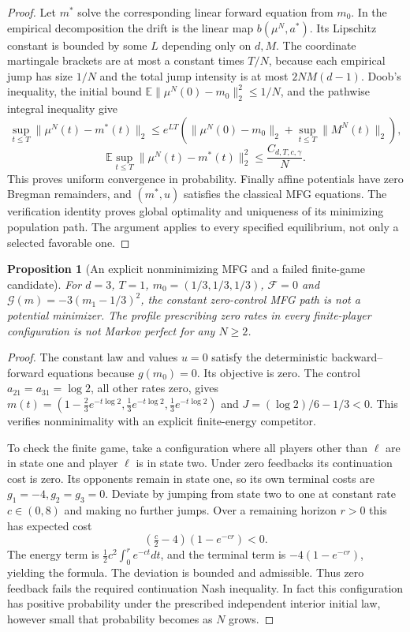 \documentclass[11pt,a4paper]{article}
\newtheorem{proposition}[theorem]{Proposition}
\theoremstyle{definition}
\theoremstyle{remark}
\begin{document}
\begin{proof}
Let $m^*$ solve the corresponding linear forward equation from $m_0$. In the empirical decomposition the drift is the linear map $b(\mu^N,a^*)$. Its Lipschitz constant is bounded by some $L$ depending only on $d,M$. The coordinate martingale brackets are at most a constant times $T/N$, because each empirical jump has size $1/N$ and the total jump intensity is at most $2NM(d-1)$. Doob's inequality, the initial bound $\mathbb E\|\mu^N(0)-m_0\|_2^2\leq1/N$, and the pathwise integral inequality give
\[
 \sup_{t\leq T}\|\mu^N(t)-m^*(t)\|_2
 \leq e^{LT}\left(\|\mu^N(0)-m_0\|_2+
                 \sup_{t\leq T}\|M^N(t)\|_2\right),
\]
\[
 \mathbb E\sup_{t\leq T}\|\mu^N(t)-m^*(t)\|_2^2\leq\frac{C_{d,T,c,\gamma}}N.
\]
This proves uniform convergence in probability. Finally affine potentials have zero Bregman remainders, and $(m^*,u)$ satisfies the classical MFG equations. The verification identity proves global optimality and uniqueness of its minimizing population path. The argument applies to every specified equilibrium, not only a selected favorable one.
\end{proof}

\begin{proposition}[An explicit nonminimizing MFG and a failed finite-game candidate]
For $d=3$, $T=1$, $m_0=(1/3,1/3,1/3)$, $\mathcal F=0$ and
$\mathcal G(m)=-3(m_1-1/3)^2$, the constant zero-control MFG path is not a potential minimizer. The profile prescribing zero rates in every finite-player configuration is not Markov perfect for any $N\geq2$.
\end{proposition}
\begin{proof}
The constant law and values $u=0$ satisfy the deterministic backward--forward equations because $g(m_0)=0$. Its objective is zero. The control $a_{21}=a_{31}=\log2$, all other rates zero, gives
$m(t)=(1-\frac23e^{-t\log2},\frac13e^{-t\log2},\frac13e^{-t\log2})$ and
$J=(\log2)/6-1/3<0$. This verifies nonminimality with an explicit finite-energy competitor.

To check the finite game, take a configuration where all players other than $\ell$ are in state one and player $\ell$ is in state two. Under zero feedbacks its continuation cost is zero. Its opponents remain in state one, so its own terminal costs are $g_1=-4,g_2=g_3=0$. Deviate by jumping from state two to one at constant rate $c\in(0,8)$ and making no further jumps. Over a remaining horizon $r>0$ this has expected cost
\[
 \left(\tfrac c2-4\right)(1-e^{-cr})<0.
\]
The energy term is $\frac12c^2\int_0^r e^{-ct}dt$, and the terminal term is $-4(1-e^{-cr})$, yielding the formula. The deviation is bounded and admissible. Thus zero feedback fails the required continuation Nash inequality. In fact this configuration has positive probability under the prescribed independent interior initial law, however small that probability becomes as $N$ grows.
\end{proof}
\end{document}
